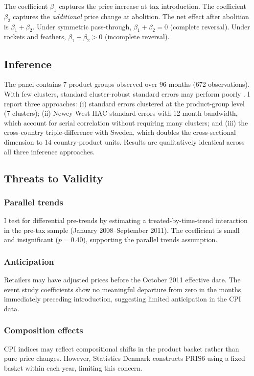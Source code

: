 \documentclass[12pt]{article}
\begin{document}
The coefficient $\beta_1$ captures the price increase at tax introduction. The coefficient $\beta_2$ captures the \textit{additional} price change at abolition. The net effect after abolition is $\beta_1 + \beta_2$. Under symmetric pass-through, $\beta_1 + \beta_2 = 0$ (complete reversal). Under rockets and feathers, $\beta_1 + \beta_2 > 0$ (incomplete reversal).

\subsection{Inference}

The panel contains 7 product groups observed over 96 months (672 observations). With few clusters, standard cluster-robust standard errors may perform poorly \citep{cameron2015}. I report three approaches: (i) standard errors clustered at the product-group level (7 clusters); (ii) Newey-West HAC standard errors with 12-month bandwidth, which account for serial correlation without requiring many clusters; and (iii) the cross-country triple-difference with Sweden, which doubles the cross-sectional dimension to 14 country-product units. Results are qualitatively identical across all three inference approaches.

\subsection{Threats to Validity}

\subsubsection*{Parallel trends} I test for differential pre-trends by estimating a treated-by-time-trend interaction in the pre-tax sample (January 2008--September 2011). The coefficient is small and insignificant ($p = 0.40$), supporting the parallel trends assumption.

\subsubsection*{Anticipation} Retailers may have adjusted prices before the October 2011 effective date. The event study coefficients show no meaningful departure from zero in the months immediately preceding introduction, suggesting limited anticipation in the CPI data.

\subsubsection*{Composition effects} CPI indices may reflect compositional shifts in the product basket rather than pure price changes. However, Statistics Denmark constructs PRIS6 using a fixed basket within each year, limiting this concern.
\end{document}
